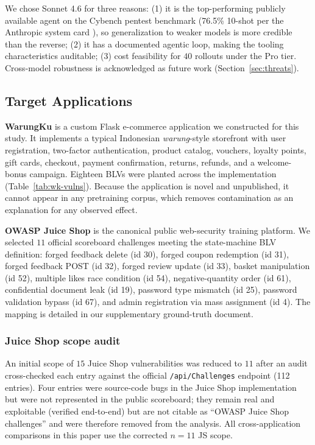 \documentclass[conference]{IEEEtran}
\begin{document}
We chose Sonnet 4.6 for three reasons: (1) it is the top-performing publicly available agent on the Cybench pentest benchmark \cite{zhang2024cybench} (76.5\% 10-shot per the Anthropic system card \cite{anthropic_sonnet45}), so generalization to weaker models is more credible than the reverse; (2) it has a documented agentic loop, making the tooling characteristics auditable; (3) cost feasibility for $40$ rollouts under the Pro tier. Cross-model robustness is acknowledged as future work (Section~\ref{sec:threats}).

\subsection{Target Applications}

\textbf{WarungKu} is a custom Flask e-commerce application we constructed for this study. It implements a typical Indonesian \emph{warung}-style storefront with user registration, two-factor authentication, product catalog, vouchers, loyalty points, gift cards, checkout, payment confirmation, returns, refunds, and a welcome-bonus campaign. Eighteen BLVs were planted across the implementation (Table~\ref{tab:wk-vulns}). Because the application is novel and unpublished, it cannot appear in any pretraining corpus, which removes contamination as an explanation for any observed effect.

\textbf{OWASP Juice Shop} \cite{juiceshop} is the canonical public web-security training platform. We selected $11$ official scoreboard challenges meeting the state-machine BLV definition: forged feedback delete (id 30), forged coupon redemption (id 31), forged feedback POST (id 32), forged review update (id 33), basket manipulation (id 52), multiple likes race condition (id 54), negative-quantity order (id 61), confidential document leak (id 19), password type mismatch (id 25), password validation bypass (id 67), and admin registration via mass assignment (id 4). The mapping is detailed in our supplementary ground-truth document.

\subsubsection{Juice Shop scope audit}
\label{sec:js-scope}
An initial scope of $15$ Juice Shop vulnerabilities was reduced to $11$ after an audit cross-checked each entry against the official \texttt{/api/Challenges} endpoint (112 entries). Four entries were source-code bugs in the Juice Shop implementation but were not represented in the public scoreboard; they remain real and exploitable (verified end-to-end) but are not citable as ``OWASP Juice Shop challenges'' and were therefore removed from the analysis. All cross-application comparisons in this paper use the corrected $n = 11$ JS scope.
\end{document}

